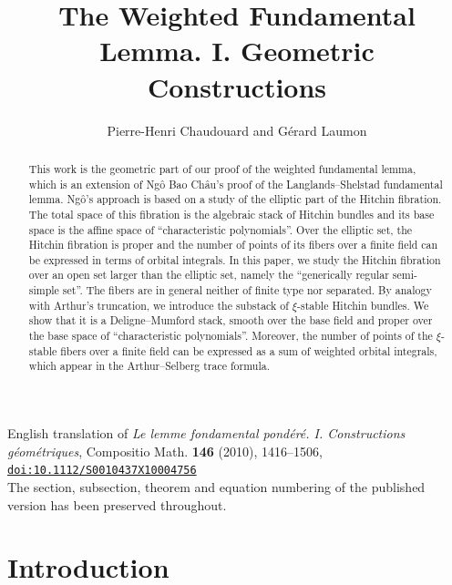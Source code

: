 \documentclass[12pt,a4paper,oneside,english,leqno]{smfart}
\title[The Weighted Fundamental Lemma. I]{The Weighted Fundamental Lemma. I. Geometric Constructions}
\author{Pierre-Henri Chaudouard and G\'{e}rard Laumon}
\date{}
\newcounter{theo}
\numberwithin{theo}{subsection}
\newcommand{\doi}[1]{\href{https://doi.org/#1}{\texttt{doi:#1}}}
\begin{document}

\pagestyle{plain}
\raggedbottom
{}
\setlength{\emergencystretch}{2em}

\begin{abstract}
This work is the geometric part of our proof of the weighted fundamental lemma, which is an extension of Ng\^{o} Bao Ch\^{a}u's proof of the Langlands--Shelstad fundamental lemma. Ng\^{o}'s approach is based on a study of the elliptic part of the Hitchin fibration. The total space of this fibration is the algebraic stack of Hitchin bundles and its base space is the affine space of ``characteristic polynomials''. Over the elliptic set, the Hitchin fibration is proper and the number of points of its fibers over a finite field can be expressed in terms of orbital integrals. In this paper, we study the Hitchin fibration over an open set larger than the elliptic set, namely the ``generically regular semi-simple set''. The fibers are in general neither of finite type nor separated. By analogy with Arthur's truncation, we introduce the substack of $\xi$-stable Hitchin bundles. We show that it is a Deligne--Mumford stack, smooth over the base field and proper over the base space of ``characteristic polynomials''. Moreover, the number of points of the $\xi$-stable fibers over a finite field can be expressed as a sum of weighted orbital integrals, which appear in the Arthur--Selberg trace formula.
\end{abstract}

\maketitle

\begin{center}
\small English translation of \emph{Le lemme fondamental pond\'er\'e. I. Constructions g\'eom\'etriques}, Compositio Math. \textbf{146} (2010), 1416--1506,\\
\doi{10.1112/S0010437X10004756}\\[2pt]
The section, subsection, theorem and equation numbering of the published version has been preserved throughout.
\end{center}

\tableofcontents

\section{Introduction}
\end{document}
